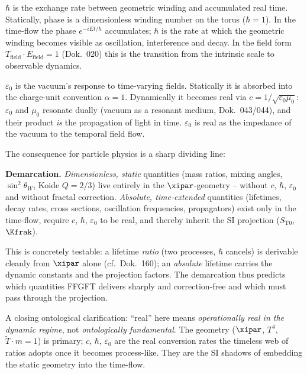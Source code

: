 \textbf{$\hbar$} is the exchange rate between geometric winding and accumulated
real time. Statically, phase is a dimensionless winding number on the torus
($\hbar=1$). In the time-flow the phase $e^{-iEt/\hbar}$ accumulates; $\hbar$ is
the rate at which the geometric winding becomes visible as oscillation,
interference and decay. In the field form $T_{\text{field}}\cdot E_{\text{field}}=1$
(Dok.~020) this is the transition from the intrinsic scale to observable dynamics.

\textbf{$\varepsilon_0$} is the vacuum's response to time-varying fields.
Statically it is absorbed into the charge-unit convention $\alpha=1$. Dynamically
it becomes real via $c=1/\sqrt{\varepsilon_0\mu_0}$: $\varepsilon_0$ and $\mu_0$
resonate dually (vacuum as a resonant medium, Dok.~043/044), and their product
\emph{is} the propagation of light in time. $\varepsilon_0$ is real as the
impedance of the vacuum to the temporal field flow.

The consequence for particle physics is a sharp dividing line:

\begin{prinzip}
\textbf{Demarcation.} \emph{Dimensionless, static} quantities (mass ratios,
mixing angles, $\sin^2\theta_W$, Koide $Q=2/3$) live entirely in the
$\xipar$-geometry -- without $c$, $\hbar$, $\varepsilon_0$ and without fractal
correction. \emph{Absolute, time-extended} quantities (lifetimes, decay rates,
cross sections, oscillation frequencies, propagators) exist only in the time-flow,
require $c$, $\hbar$, $\varepsilon_0$ to be real, and thereby inherit the SI
projection ($S_{\mathrm{T0}}$, $\Kfrak$).
\end{prinzip}

This is concretely testable: a lifetime \emph{ratio} (two processes, $\hbar$
cancels) is derivable cleanly from $\xipar$ alone (cf.~Dok.~160); an \emph{absolute}
lifetime carries the dynamic constants and the projection factors. The demarcation
thus predicts which quantities FFGFT delivers sharply and correction-free and
which must pass through the projection.

A closing ontological clarification: ``real'' here means \emph{operationally real
in the dynamic regime}, not \emph{ontologically fundamental}. The geometry
($\xipar$, $T^4$, $\tilde T\cdot m=1$) is primary; $c$, $\hbar$, $\varepsilon_0$
are the real conversion rates the timeless web of ratios adopts once it becomes
process-like. They are the SI shadows of embedding the static geometry into the
time-flow.

